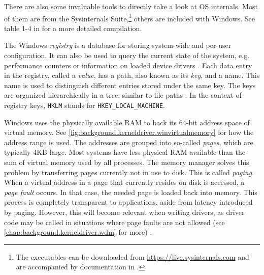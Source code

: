 There are also some invaluable tools to directly take a look at OS internals. Most of them are from the Sysinternals Suite,\footnote{\label{fn:background.kerneldriver.sysinternals} The executables can be downloaded from \url{https://live.sysinternals.com} and are accompanied by documentation in \cite{Russinovich2016}.} others are included with Windows. See table 1-4 in \cite{Yosifovich2017} for a more detailed compilation.

The Windows \emph{registry} is a database for storing system-wide and per-user configuration. It can also be used to query the current state of the system, e.g. performance counters or information on loaded device drivers \cite{Yosifovich2017}. Each data entry in the registry, called a \emph{value}, has a path, also known as its \emph{key}, and a name. This name is used to distinguish different entries stored under the same key. The keys are organized hierarchically in a tree, similar to file paths \cite{Win32}. In the context of registry keys, \texttt{HKLM} stands for \texttt{HKEY\_LOCAL\_MACHINE}.

Windows uses the physically available RAM to back its 64-bit address space of virtual memory. See \autoref{fig:background.kerneldriver.winvirtualmemory} for how the address range is used. The addresses are grouped into so-called \emph{pages}, which are typically 4KB large. Most systems have less physical RAM available than the sum of virtual memory used by all processes. The memory manager solves this problem by transferring pages currently not in use to disk. This is called \emph{paging}. When a virtual address in a page that currently resides on disk is accessed, a \emph{page fault} occurs. In that case, the needed page is loaded back into memory. This process is completely transparent to applications, aside from latency introduced by paging. However, this will become relevant when writing drivers, as driver code may be called in situations where page faults are not allowed (see \autoref{chap:background.kerneldriver.wdm} for more) \cite{Yosifovich2017}.

